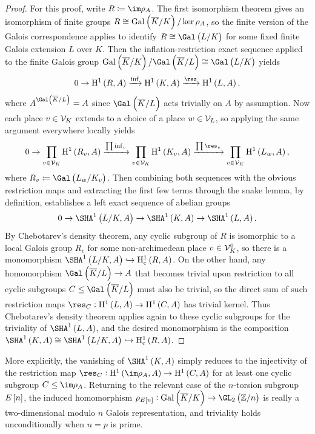 \begin{proof}
For this proof, write $ R \coloneqq \im \rho_A $. The first isomorphism theorem gives an isomorphism of finite groups $ R \cong \AG{K} / \ker \rho_A $, so the finite version of the Galois correspondence applies to identify $ R \cong \Gal\br{L / K} $ for some fixed finite Galois extension $ L $ over $ K $. Then the inflation-restriction exact sequence applied to the finite Galois group $ \AG{K} / \Gal\br{\overline{K} / L} \cong \Gal\br{L / K} $ yields
$$ 0 \to \H^1\br{R, A} \xrightarrow{\inf} \H^1\br{K, A} \xrightarrow{\res} \H^1\br{L, A}, $$
where $ A^{\Gal\br{\overline{K} / L}} = A $ since $ \Gal\br{\overline{K} / L} $ acts trivially on $ A $ by assumption. Now each place $ v \in \mathcal{V}_K $ extends to a choice of a place $ w \in \mathcal{V}_L $, so applying the same argument everywhere locally yields
$$ 0 \to \PV\H^1\br{R_v, A} \xrightarrow{\prod \inf_v} \PV\H^1\br{K_v, A} \xrightarrow{\prod \res_v} \PV\H^1\br{L_w, A}, $$
where $ R_v \coloneqq \Gal\br{L_w / K_v} $. Then combining both sequences with the obvious restriction maps and extracting the first few terms through the snake lemma, by definition, establishes a left exact sequence of abelian groups
$$ 0 \to \Sha[L / K, A] \to \Sha[K, A] \to \Sha[L, A]. $$
By Chebotarev's density theorem, any cyclic subgroup of $ R $ is isomorphic to a local Galois group $ R_v $ for some non-archimedean place $ v \in \mathcal{V}_K^0 $, so there is a monomorphism $ \Sha[L / K, A] \hookrightarrow \H_\c^1\br{R, A} $. On the other hand, any homomorphism $ \Gal\br{\overline{K} / L} \to A $ that becomes trivial upon restriction to all cyclic subgroups $ C \le \Gal\br{\overline{K} / L} $ must also be trivial, so the direct sum of such restriction maps $ \res_C : \H^1\br{L, A} \to \H^1\br{C, A} $ has trivial kernel. Thus Chebotarev's density theorem applies again to these cyclic subgroups for the triviality of $ \Sha[L, A] $, and the desired monomorphism is the composition $ \Sha[K, A] \cong \Sha[L / K, A] \hookrightarrow \H_\c^1\br{R, A} $.
\end{proof}

More explicitly, the vanishing of $ \Sha[K, A] $ simply reduces to the injectivity of the restriction map $ \res_C : \H^1\br{\im \rho_A, A} \to \H^1\br{C, A} $ for at least one cyclic subgroup $ C \le \im \rho_A $. Returning to the relevant case of the $ n $-torsion subgroup $ E\sbr{n} $, the induced homomorphism $ \rho_{E\sbr{n}} : \AG{K} \to \GL_2\br{\ZZ / n} $ is really a two-dimensional modulo $ n $ Galois representation, and triviality holds unconditionally when $ n = p $ is prime.


